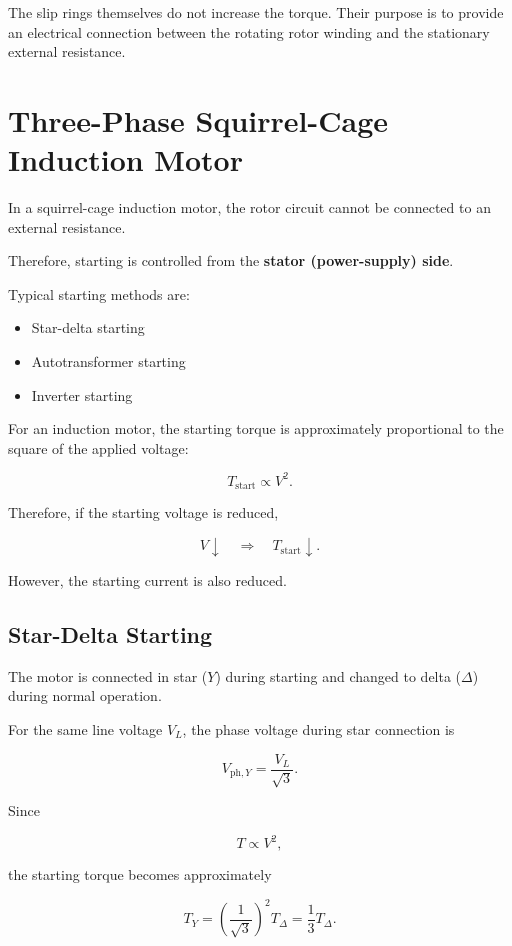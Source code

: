 \documentclass[a4paper,11pt]{article}
\begin{document}
The slip rings themselves do not increase the torque.
Their purpose is to provide an electrical connection between the
rotating rotor winding and the stationary external resistance.

\section{Three-Phase Squirrel-Cage Induction Motor}

In a squirrel-cage induction motor, the rotor circuit cannot be
connected to an external resistance.

Therefore, starting is controlled from the \textbf{stator (power-supply) side}.

Typical starting methods are:

\begin{itemize}
    \item Star-delta starting
    \item Autotransformer starting
    \item Inverter starting
\end{itemize}

For an induction motor, the starting torque is approximately
proportional to the square of the applied voltage:

\[
\boxed{T_{\mathrm{start}} \propto V^2}.
\]

Therefore, if the starting voltage is reduced,

\[
V \downarrow
\quad\Rightarrow\quad
T_{\mathrm{start}} \downarrow.
\]

However, the starting current is also reduced.

\subsection{Star-Delta Starting}

The motor is connected in star (\(Y\)) during starting and changed to
delta (\(\Delta\)) during normal operation.

For the same line voltage \(V_L\), the phase voltage during star
connection is

\[
V_{\mathrm{ph},Y}
=
\frac{V_L}{\sqrt{3}}.
\]

Since

\[
T \propto V^2,
\]

the starting torque becomes approximately

\[
T_Y
=
\left(
\frac{1}{\sqrt{3}}
\right)^2 T_{\Delta}
=
\frac{1}{3}T_{\Delta}.
\]
\end{document}
